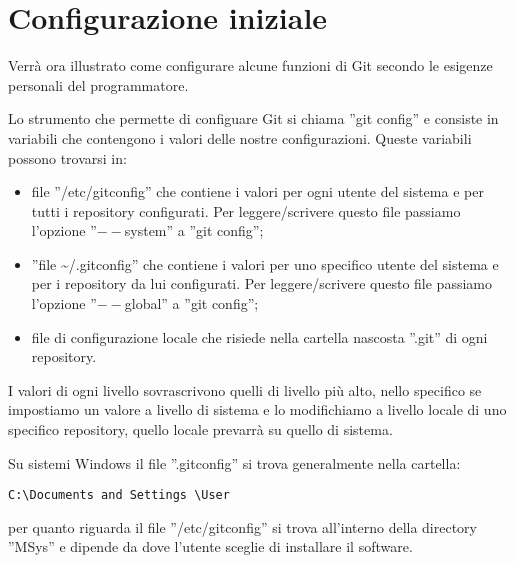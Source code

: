 \section{Configurazione iniziale}
Verrà ora illustrato come configurare alcune funzioni di Git secondo le esigenze personali del programmatore.

Lo strumento che permette di configuare Git si chiama ''git config'' e consiste in variabili che contengono i valori delle nostre configurazioni. Queste variabili possono trovarsi in:

\begin{itemize}
\item file ''/etc/gitconfig'' che contiene i valori per ogni utente del sistema e per tutti i repository configurati. Per leggere/scrivere questo file passiamo l'opzione ''$--$system'' a ''git config'';
\item ''file \textasciitilde /.gitconfig'' che contiene i valori per uno specifico utente del sistema e per i repository da lui configurati. Per leggere/scrivere questo file passiamo l'opzione ''$--$global'' a ''git config'';
\item file di configurazione locale che risiede nella cartella nascosta ''.git'' di ogni repository.
\end{itemize}

I valori di ogni livello sovrascrivono quelli di livello più alto, nello specifico se impostiamo un valore a livello di sistema e lo modifichiamo a livello locale di uno specifico repository, quello locale prevarrà su quello di sistema.

Su sistemi Windows il file ''.gitconfig'' si trova generalmente nella cartella:

\begin{center}
\texttt{C:\textbackslash Documents and Settings \textbackslash User}
\end{center}

per quanto riguarda il file ''/etc/gitconfig'' si trova all'interno della directory ''MSys'' e dipende da dove l'utente sceglie di installare il software.









